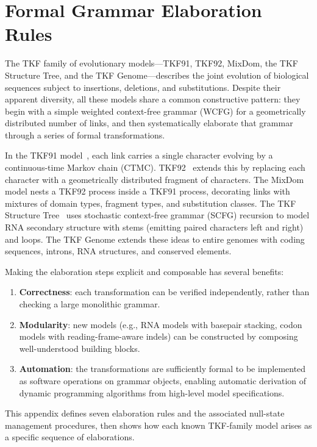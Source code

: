 \section{Formal Grammar Elaboration Rules}
\label{sec:appendix-grammar}

The TKF family of evolutionary models---TKF91, TKF92, MixDom,
the TKF Structure Tree, and the TKF Genome---describes the joint
evolution of biological sequences subject to insertions, deletions,
and substitutions.  Despite their apparent diversity, all these models
share a common constructive pattern: they begin with a simple weighted
context-free grammar (WCFG) for a geometrically distributed number of
links, and then systematically elaborate that grammar through a
series of formal transformations.

In the TKF91 model~\cite{ThorneEtAl91}, each link carries a single character evolving by a
continuous-time Markov chain (CTMC).  TKF92~\cite{ThorneEtAl92}
extends this by replacing each character with a geometrically
distributed fragment of characters.  The MixDom model nests a TKF92
process inside a TKF91 process, decorating links with mixtures of
domain types, fragment types, and substitution classes.  The TKF
Structure Tree~\cite{Holmes2004} uses stochastic context-free grammar
(SCFG) recursion to model RNA secondary structure with stems (emitting
paired characters left and right) and loops.  The TKF Genome extends
these ideas to entire genomes with coding sequences, introns, RNA structures,
and conserved elements.

Making the elaboration steps explicit and composable has several benefits:
\begin{enumerate}[label=(\roman*)]
\item \textbf{Correctness}: each transformation can be verified independently,
  rather than checking a large monolithic grammar.
\item \textbf{Modularity}: new models (e.g., RNA models with basepair stacking,
  codon models with reading-frame-aware indels) can be constructed by
  composing well-understood building blocks.
\item \textbf{Automation}: the transformations are sufficiently formal
  to be implemented as software operations on grammar objects,
  enabling automatic derivation of dynamic programming algorithms
  from high-level model specifications.
\end{enumerate}

This appendix defines seven elaboration rules and the associated
null-state management procedures, then shows how each known
TKF-family model arises as a specific sequence of elaborations.

